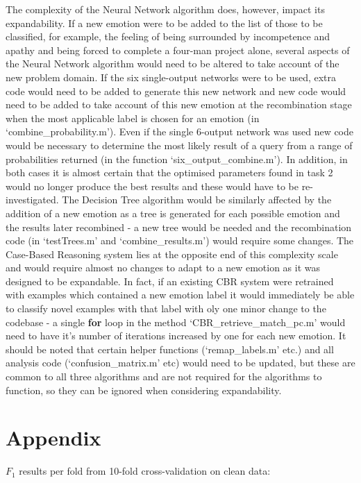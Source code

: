 \documentclass[a4paper]{article}
\begin{document}
The complexity of the Neural Network algorithm does, however, impact its expandability. If a new emotion were to be added to the list of
those to be classified, for example, the feeling of being surrounded by incompetence and apathy and being forced to complete a four-man project
alone, several aspects of the Neural Network algorithm would need to be altered to take account of the new problem domain. If the six single-output
networks were to be used, extra code would need to be added to generate this new network and new code would need to be added to take account of
this new emotion at the recombination stage when the most applicable label is chosen for an emotion (in `combine\_probability.m').
Even if the single 6-output network was used new code would be necessary to determine the most likely result of a query from a range of
probabilities returned (in the function `six\_output\_combine.m'). In addition, in both cases it is almost certain that the optimised parameters
found in task 2 would no longer produce the best results and these would have to be re-investigated. The Decision Tree algorithm would be
similarly affected by the addition of a new emotion as a tree is generated for each possible emotion and the results later recombined - a new tree
would be needed and the recombination code (in `testTrees.m' and `combine\_results.m') would require some changes. The Case-Based Reasoning system
lies at the opposite end of this complexity scale and would require almost no changes to adapt to a new emotion as it was designed to be expandable.
In fact, if an existing CBR system were retrained with examples which contained a new emotion label it would immediately be able to classify novel
examples with that label with oly one minor change to the codebase - a single {\bf for} loop in the method `CBR_retrieve_match_pc.m' would need
to have it's number of iterations increased by one for each new emotion. It should be noted that certain helper functions (`remap_labels.m' etc.)
and all analysis code (`confusion_matrix.m' etc) would need to be updated, but these are common to all three algorithms and are not required
for the algorithms to function, so they can be ignored when considering expandability.
 
 
\newpage 
\section{Appendix}

$F_1$ results per fold from 10-fold cross-validation on clean data:\\
\end{document}
